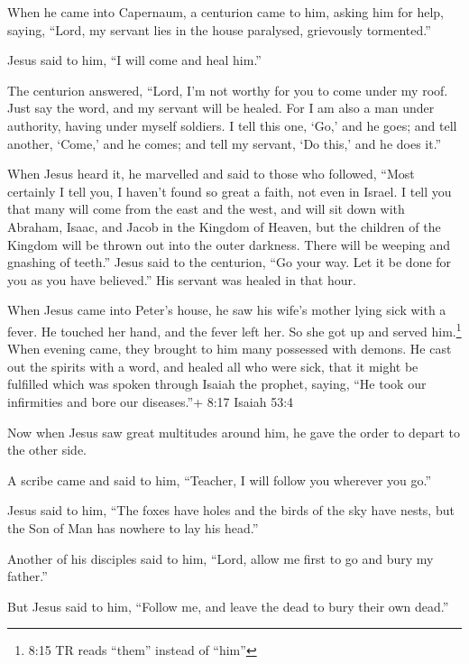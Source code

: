  When he came into Capernaum, a centurion came to him,
asking him for help,  saying, ``Lord, my servant lies in the
house paralysed, grievously tormented.''

 Jesus said to him, ``I will come and heal him.''

 The centurion answered, ``Lord, I'm not worthy for you to
come under my roof. Just say the word, and my servant will be healed.
 For I am also a man under authority, having under myself
soldiers. I tell this one, `Go,' and he goes; and tell another, `Come,'
and he comes; and tell my servant, `Do this,' and he does it.''

 When Jesus heard it, he marvelled and said to those who
followed, ``Most certainly I tell you, I haven't found so great a faith,
not even in Israel.  I tell you that many will come from
the east and the west, and will sit down with Abraham, Isaac, and Jacob
in the Kingdom of Heaven,  but the children of the Kingdom
will be thrown out into the outer darkness. There will be weeping and
gnashing of teeth.''  Jesus said to the centurion, ``Go
your way. Let it be done for you as you have believed.'' His servant was
healed in that hour.

 When Jesus came into Peter's house, he saw his wife's
mother lying sick with a fever.  He touched her hand, and
the fever left her. So she got up and served him.\footnote{8:15 TR reads
  ``them'' instead of ``him''}  When evening came, they
brought to him many possessed with demons. He cast out the spirits with
a word, and healed all who were sick,  that it might be
fulfilled which was spoken through Isaiah the prophet, saying, ``He took
our infirmities and bore our diseases.''+ 8:17 Isaiah 53:4

 Now when Jesus saw great multitudes around him, he gave
the order to depart to the other side.

 A scribe came and said to him, ``Teacher, I will follow
you wherever you go.''

 Jesus said to him, ``The foxes have holes and the birds of
the sky have nests, but the Son of Man has nowhere to lay his head.''

 Another of his disciples said to him, ``Lord, allow me
first to go and bury my father.''

 But Jesus said to him, ``Follow me, and leave the dead to
bury their own dead.''

